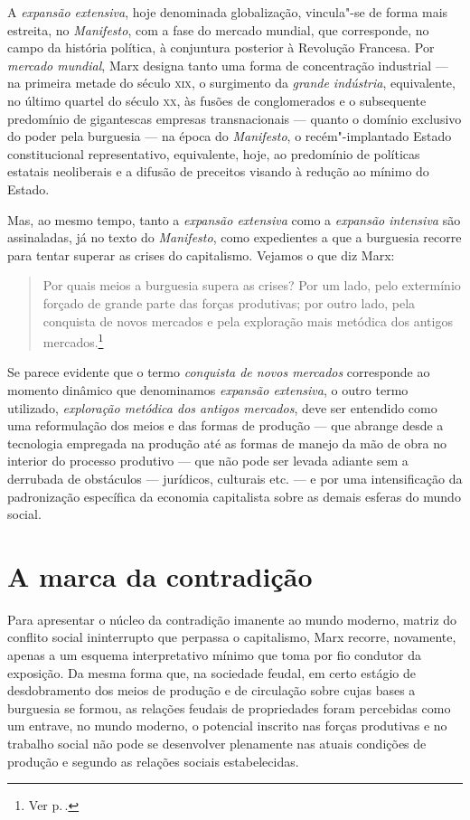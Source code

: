 A \textit{expansão extensiva}, hoje denominada globalização, vincula"-se de
forma mais estreita, no \textit{Manifesto}, com a fase do mercado
mundial, que corresponde, no campo da história política, à conjuntura
posterior à Revolução Francesa. Por \textit{mercado mundial}, Marx designa
tanto uma forma de concentração industrial --- na primeira metade do
século \textsc{xix}, o surgimento da \textit{grande indústria}, equivalente, no último
quartel do século \textsc{xx}, às fusões de conglomerados e o subsequente
predomínio de gigantescas empresas transnacionais --- quanto o domínio
exclusivo do poder pela burguesia --- na época do \textit{Manifesto}, o
recém"-implantado Estado constitucional representativo, equivalente,
hoje, ao predomínio de políticas estatais neoliberais e a difusão de
preceitos visando à redução ao mínimo do Estado.

Mas, ao mesmo tempo, tanto a \textit{expansão extensiva} como a \textit{expansão
intensiva} são assinaladas, já no texto do \textit{Manifesto}, como
expedientes a que a burguesia recorre para tentar superar as crises do
capitalismo. Vejamos o que diz Marx:

\begin{quote} 
Por quais meios a burguesia supera as crises? Por um lado, pelo
extermínio forçado de grande parte das forças produtivas; por outro
lado, pela conquista de novos mercados e pela exploração mais metódica
dos antigos mercados.\footnote{Ver p.\,\pageref{9}.}
\end{quote} 

Se parece evidente que o termo \textit{conquista de novos mercados} corresponde
ao momento dinâmico que denominamos \textit{expansão extensiva}, o outro termo
utilizado, \textit{exploração metódica dos antigos mercados}, deve ser
entendido como uma reformulação dos meios e das formas de produção --- que
abrange desde a tecnologia empregada na produção até as formas de
manejo da mão de obra no interior do processo produtivo --- que não
pode ser levada adiante sem a derrubada de obstáculos --- jurídicos,
culturais etc. --- e por uma intensificação da padronização específica da
economia capitalista sobre as demais esferas do mundo social.

\section*{A marca da contradição}

Para apresentar o núcleo da contradição imanente ao mundo moderno,
matriz do conflito social ininterrupto que perpassa o capitalismo, Marx
recorre, novamente, apenas a um esquema interpretativo mínimo que toma
por fio condutor da exposição. Da mesma forma que, na sociedade feudal,
em certo estágio de desdobramento dos meios de produção e de circulação
sobre cujas bases a burguesia se formou, as relações feudais de
propriedades foram percebidas como um entrave, no mundo moderno, o
potencial inscrito nas forças produtivas e no trabalho social não pode
se desenvolver plenamente nas atuais condições de produção e segundo as
relações sociais estabelecidas.

